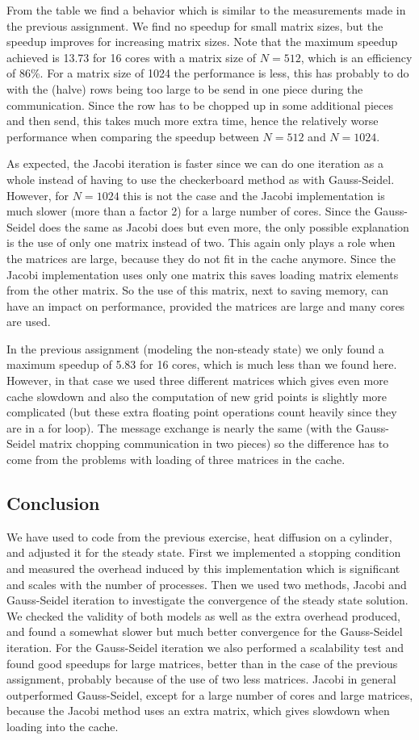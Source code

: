 \documentclass[11pt,a4paper,onecolumn]{article}
\begin{document}
From the table we find a behavior which is similar to the measurements made in the previous assignment. We find no speedup for small matrix sizes, but the speedup improves for increasing matrix sizes. Note that the maximum speedup achieved is 13.73 for 16 cores with a matrix size of $N = 512$, which is an efficiency of 86\%. For a matrix size of 1024 the performance is less, this has probably to do with the (halve) rows being too large to be send in one piece during the communication. Since the row has to be chopped up in some additional pieces and then send, this takes much more extra time, hence the relatively worse performance when comparing the speedup between $N = 512$ and $N = 1024$. 

As expected, the Jacobi iteration is faster since we can do one iteration as a whole instead of having to use the checkerboard method as with Gauss-Seidel. However, for $N = 1024$ this is not the case and the Jacobi implementation is much slower (more than a factor 2) for a large number of cores. Since the Gauss-Seidel does the same as Jacobi does but even more, the only possible explanation is the use of only one matrix instead of two. This again only plays a role when the matrices are large, because they do not fit in the cache anymore. Since the Jacobi implementation uses only one matrix this saves loading matrix elements from the other matrix. So the use of this matrix, next to saving memory, can have an impact on performance, provided the matrices are large and many cores are used.

In the previous assignment (modeling the non-steady state) we only found a maximum speedup of 5.83 for 16 cores, which is much less than we found here. However, in that case we used three different matrices which gives even more cache slowdown and also the computation of new grid points is slightly more complicated (but these extra floating point operations count heavily since they are in a for loop). The message exchange is nearly the same (with the Gauss-Seidel matrix chopping communication in two pieces) so the difference has to come from the problems with loading of three matrices in the cache.

\subsection{Conclusion}
We have used to code from the previous exercise, heat diffusion on a cylinder, and adjusted it for the steady state. First we implemented a stopping condition and measured the overhead induced by this implementation which is significant and scales with the number of processes. Then we used two methods, Jacobi and Gauss-Seidel iteration to investigate the convergence of the steady state solution. We checked the validity of both models as well as the extra overhead produced, and found a somewhat slower but much better convergence for the Gauss-Seidel iteration. For the Gauss-Seidel iteration we also performed a scalability test and found good speedups for large matrices, better than in the case of the previous assignment, probably because of the use of two less matrices. Jacobi in general outperformed Gauss-Seidel, except for a large number of cores and large matrices, because the Jacobi method uses an extra matrix, which gives slowdown when loading into the cache. 
\end{document}
